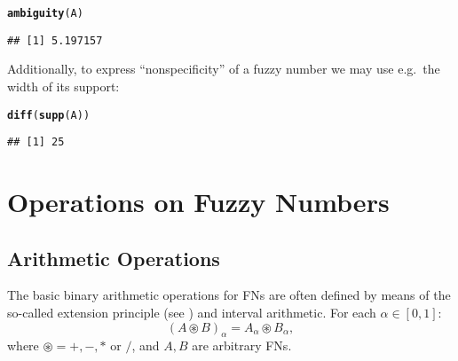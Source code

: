 \documentclass[11pt]{article}\usepackage{graphicx, color}
\makeatletter
\newcommand{\hlfunctioncall}[1]{\textcolor[rgb]{0.501960784313725,0,0.329411764705882}{\textbf{#1}}}%
\newenvironment{kframe}{%
 \def\at@end@of@kframe{}%
 \ifinner\ifhmode%
  \def\at@end@of@kframe{\end{minipage}}%
  \begin{minipage}{\columnwidth}%
 \fi\fi%
 \def\FrameCommand##1{\hskip\@totalleftmargin \hskip-\fboxsep
 \colorbox{shadecolor}{##1}\hskip-\fboxsep
     \hskip-\linewidth \hskip-\@totalleftmargin \hskip\columnwidth}%
 \MakeFramed {\advance\hsize-\width
   \@totalleftmargin\z@ \linewidth\hsize
   \@setminipage}}%
 {\par\unskip\endMakeFramed%
 \at@end@of@kframe}
\newenvironment{knitrout}{}{} %
\makeatother
\begin{document}
\begin{knitrout}\small
{}\color{fgcolor}\begin{kframe}
\begin{alltt}
\hlfunctioncall{ambiguity}(A)
\end{alltt}
\begin{verbatim}
## [1] 5.197157
\end{verbatim}
\end{kframe}
\end{knitrout}


\bigskip
Additionally, to express ``nonspecificity'' of a fuzzy number
we may use e.g.~the width of its support:

\begin{knitrout}\small
{}\color{fgcolor}\begin{kframe}
\begin{alltt}
\hlfunctioncall{diff}(\hlfunctioncall{supp}(A))
\end{alltt}
\begin{verbatim}
## [1] 25
\end{verbatim}
\end{kframe}
\end{knitrout}





\section{Operations on Fuzzy Numbers}\label{Sec:Operations}

\subsection{Arithmetic Operations}

The basic binary arithmetic operations for FNs are often defined
by means of the so-called extension principle 
(see \cite{KlirYuan1995:fuzzybook})
and interval arithmetic.
For each $\alpha\in[0,1]$:
\[
   (A \circledast B)_\alpha
   = A_\alpha \circledast B_\alpha,
\]
where $\circledast=+,-,*$ or $/$,
and $A,B$ are arbitrary FNs.
\end{document}
